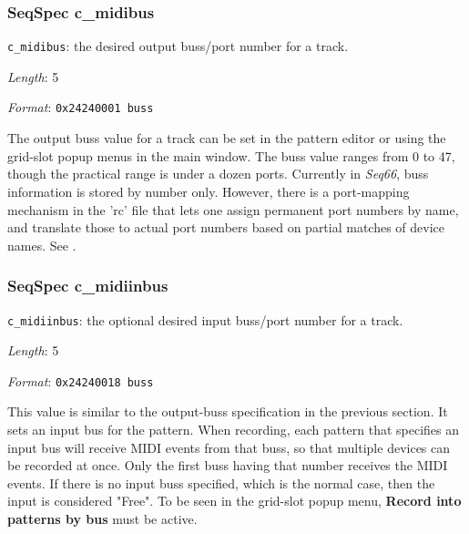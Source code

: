 \subsubsection{SeqSpec c\_midibus}
\label{subsubsec:midi_format_track_seqspec_midibus}


   \begin{description}
      \item \texttt{c\_midibus}:
         the desired output buss/port number for a track.
      \item \textsl{Length}: 5
      \item \textsl{Format}: \texttt{0x24240001 buss}
   \end{description}

   The output buss value for a track can be set in the pattern editor or using the
   grid-slot popup menus in the main window.
   The buss value ranges from 0 to 47, though the practical range is under a
   dozen ports.  Currently in \textsl{Seq66}, buss information is stored by
   number only.  However, there is a port-mapping mechanism in the 'rc' file
   that lets one assign permanent port numbers by name, and translate those to
   actual port numbers based on partial matches of device names.
   See .

\subsubsection{SeqSpec c\_midiinbus}
\label{subsubsec:midi_format_track_seqspec_midiinbus}


   \begin{description}
      \item \texttt{c\_midiinbus}:
         the optional desired input buss/port number for a track.
      \item \textsl{Length}: 5
      \item \textsl{Format}: \texttt{0x24240018 buss}
   \end{description}

   This value is similar to the output-buss specification in the previous
   section. It sets an input bus for the pattern. When recording, each
   pattern that specifies an input bus will receive MIDI events from that
   buss, so that multiple devices can be recorded at once.
   Only the first buss having that number receives the MIDI events.
   If there is no input buss specified, which is the normal case, then
   the input is considered "Free".
   To be seen in the grid-slot popup menu,
   \textbf{Record into patterns by bus} must be active.

